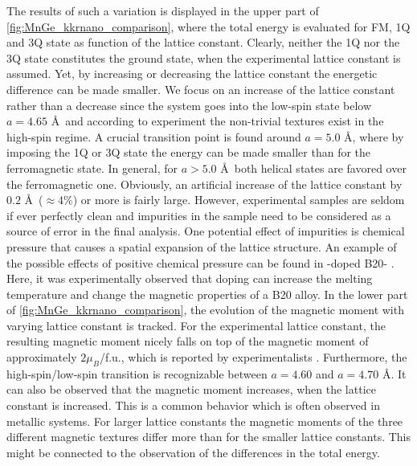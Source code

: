 \documentclass [a4paper, 12pt]{article}
\begin{document}
The results of such a variation is displayed in the upper part of \cref{fig:MnGe_kkrnano_comparison}, where
the total energy is evaluated for FM, 1Q and 3Q state as function of the lattice constant.
Clearly, neither the 1Q nor the 3Q state constitutes the ground state,
when the experimental lattice constant is assumed.
Yet, by increasing or decreasing the lattice constant the energetic difference can be made
smaller.
We focus on an increase of the lattice constant rather than a decrease since 
the system goes into the low-spin state below $a=4.65$ \AA \, \cite{rosler_ab_2012} and according to experiment
the non-trivial textures
exist in the high-spin regime.
A crucial transition point is found around $a=5.0$ \AA,
where by imposing the 1Q or 3Q state the energy can be made smaller than for the ferromagnetic state.
In general, for $a>5.0$ \AA \, both helical states are favored over the ferromagnetic one.
Obviously, an artificial increase of the lattice constant by
$0.2$ \AA \, ($\approx 4 \%$) or more is fairly large.
However, experimental samples are seldom if ever perfectly clean and
impurities in the sample need to be considered as a source of error in the
final analysis. One potential
effect of impurities is chemical pressure that causes a spatial expansion of the
lattice structure.
An example of the possible effects of positive chemical pressure
can be found in -doped B20- \cite{stolt_chemical_2018}. 
Here, it was experimentally observed
that doping can increase the melting temperature and change the magnetic properties of a B20 alloy.
In the lower part of \cref{fig:MnGe_kkrnano_comparison}, the evolution of the magnetic moment
with varying lattice constant is tracked.
For the experimental lattice constant, the resulting magnetic moment nicely falls 
on top of the magnetic moment of approximately $2 \mu_{B}$/f.u., 
which is reported by experimentalists \cite{yaouanc_magnetic_2017}.
Furthermore, the high-spin/low-spin transition is recognizable between $a=4.60$ and $a=4.70$ \AA.
It can also be observed that the magnetic moment increases, when the lattice constant is increased.
This is a common behavior which is often observed in metallic systems.
For larger lattice constants the magnetic moments of the three different
magnetic textures differ more than for the smaller lattice constants.
This might be connected to the observation of the differences in the total energy.
\end{document}
